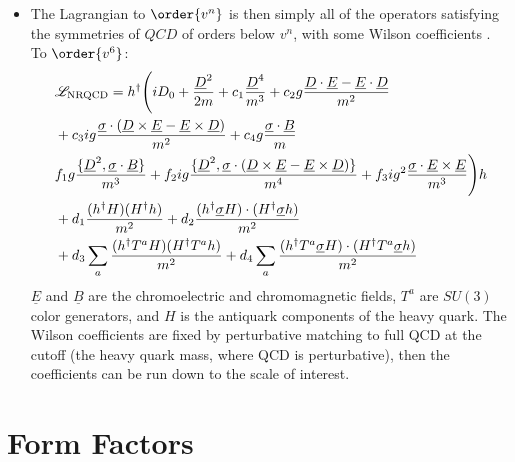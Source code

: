 \begin{itemize}
\item
The Lagrangian to $\order{v^n}$ is then simply all of the operators satisfying the symmetries of $QCD$ of orders below $v^n$, with some Wilson coefficients \cite{Lepage:1992tx}. To $\order{v^6}$:
\begin{align}
\nonumber
	&\mathscr{L}_{\text{NRQCD}} = h^{\dagger} \Bigg( i D_0 + {\underline{D}^2 \over 2m} + c_1 {\underline{D}^4\over m^3}
	+ c_2 g{\underline{D}\cdot \underline{E} - \underline{E} \cdot \underline{D} \over m^2} \\
	\nonumber
	&+ c_3 ig{ \underline{\sigma}\cdot (\underline{D}\times \underline{E} - \underline{E}\times \underline{D})\over m^2}
	+ c_4 g{ \underline{\sigma}\cdot \underline{B}\over m} \\
	\nonumber
	& f_1 g{\{\underline{D}^2,\underline{\sigma}\cdot \underline{B}\}\over m^3 }  
	+ f_2 ig{\{ \underline{D}^2,\underline{\sigma}\cdot ( \underline{D}\times \underline{E} - \underline{E}\times \underline{D})\}\over m^4 }
	+ f_3 ig^2 {\underline{\sigma}\cdot \underline{E}\times \underline{E}\over m^3}  \Bigg)h \\
	\nonumber
	&+ d_1 { (h^{\dagger} H) (H^{\dagger} h) \over m^2} + d_2 { (h^{\dagger} \underline{\sigma} H) \cdot  (H^{\dagger}\underline{\sigma} h) \over m^2} \\
	&+ d_3 \sum_a {(h^{\dagger} T^a H) (H^{\dagger} T^a h) \over m^2} + d_4 \sum_a {(h^{\dagger} T^a \underline{\sigma} H) \cdot (H^{\dagger} T^a \underline{\sigma} h) \over m^2}
\end{align}
$\underline{E}$ and $\underline{B}$ are the chromoelectric and chromomagnetic fields, $T^a$ are $SU(3)$ color generators, and $H$ is the antiquark components of the heavy quark. The Wilson coefficients are fixed by perturbative matching to full QCD at the cutoff (the heavy quark mass, where QCD is perturbative), then the coefficients can be run down to the scale of interest.

\end{itemize}

\section{Form Factors}

{}

